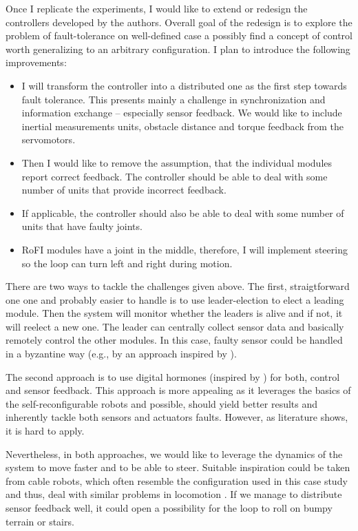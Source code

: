 Once I replicate the experiments, I would like to extend or redesign the
controllers developed by the authors. Overall goal of the redesign is to explore
the problem of fault-tolerance on well-defined case a possibly find a concept of
control worth generalizing to an arbitrary configuration. I plan to introduce
the following improvements:
\begin{itemize}
    \item I will transform the controller into a distributed one as the first
    step towards fault tolerance. This presents mainly a challenge in
    synchronization and information exchange -- especially sensor feedback. We
    would like to include inertial measurements units, obstacle distance and
    torque feedback from the servomotors.
    \item Then I would like to remove the assumption, that the individual
    modules report correct feedback. The controller should be able to deal with
    some number of units that provide incorrect feedback.
    \item If applicable, the controller should also be able to deal with some
    number of units that have faulty joints.
    \item RoFI modules have a joint in the middle, therefore, I will implement
    steering so the loop can turn left and right during motion.
\end{itemize}

There are two ways to tackle the challenges given above. The first,
straigtforward one one and probably easier to handle is to use leader-election
\cite{baca2016coordination} to elect a leading module. Then the system will
monitor whether the leaders is alive and if not, it will reelect a new one. The
leader can centrally collect sensor data and basically remotely control the
other modules. In this case, faulty sensor could be handled in a byzantine way
(e.g., by an approach inspired by \textcite{DBLP:conf/osdi/CastroL99}).

The second approach is to use digital hormones (inspired by
\cite{DBLP:conf/cec/HamannSSC10, DBLP:conf/icra/MorenoG11}) for both, control
and sensor feedback. This approach is more appealing as it leverages the basics
of the self-reconfigurable robots and possible, should yield better results and
inherently tackle both sensors and actuators faults. However, as
literature shows, it is hard to apply.

Nevertheless, in both approaches, we would like to leverage the dynamics of the
system to move faster and to be able to steer. Suitable inspiration could be
taken from cable robots, which often resemble the configuration used in this
case study and thus, deal with similar problems in locomotion
\cite{DBLP:conf/iros/Hustig-SchultzS16, DBLP:conf/iros/CeraA18}. If we manage to
distribute sensor feedback well, it could open a possibility for the loop to
roll on bumpy terrain or stairs.

